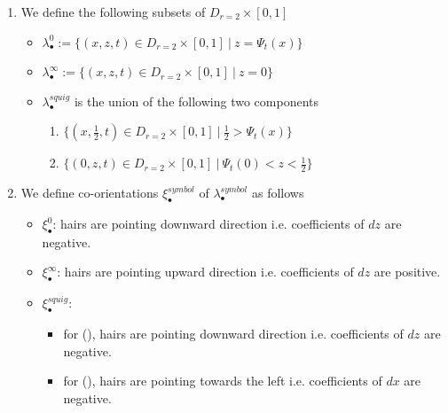 \begin{definition}
\begin{enumerate}
\item We define the following subsets of $D_{r=2}\times [0,1]$
\begin{itemize}
\item $\lambda_\bullet^0 := \{(x,z,t) \in D_{r=2} \times [0,1] ~|~ z = \Psi_t(x)\}$

\item $\lambda_\bullet^\infty := \{(x,z,t) \in D_{r=2}\times [0,1] ~|~ z = 0 \}$

\item $\lambda_\bullet^{squig}$ is the union of the following two components
\begin{enumerate}[label=(\roman*)]

\item $\{(x,\frac{1}{2},t) \in D_{r=2}\times [0,1] ~|~ \frac{1}{2} > \Psi_t(x) \}$

\item $\{(0,z,t) \in D_{r=2} \times [0,1] ~|~ \Psi_t(0) < z < \frac{1}{2} \}$
\end{enumerate}
\end{itemize}

\item We define co-orientations $\xi_\bullet^{symbol}$ of $\lambda_\bullet^{symbol}$ as follows
\begin{itemize}
\item $\xi_\bullet^0$: hairs are pointing downward direction i.e. coefficients of $dz$ are negative.

\item $\xi_\bullet^\infty$: hairs are pointing upward direction i.e. coefficients of $dz$ are positive.

\item $\xi_\bullet^{squig}$: 
\begin{itemize}
\item for (), hairs are pointing downward direction i.e. coefficients of $dz$ are negative.

\item for (), hairs are pointing towards the left i.e. coefficients of $dx$ are negative.
\end{itemize}
\end{itemize}
\end{enumerate}
\end{definition}

